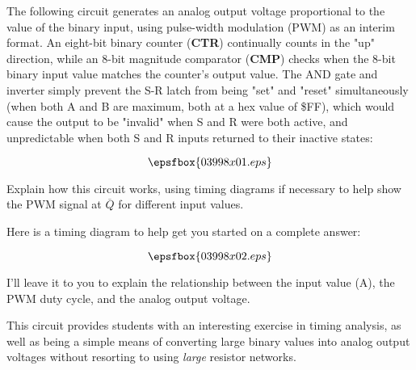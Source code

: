 

The following circuit generates an analog output voltage proportional to the value of the binary input, using pulse-width modulation (PWM) as an interim format.  An eight-bit binary counter ({\bf CTR}) continually counts in the "up" direction, while an 8-bit magnitude comparator ({\bf CMP}) checks when the 8-bit binary input value matches the counter's output value.  The AND gate and inverter simply prevent the S-R latch from being "set" and "reset" simultaneously (when both A and B are maximum, both at a hex value of \$FF), which would cause the output to be "invalid" when S and R were both active, and unpredictable when both S and R inputs returned to their inactive states:

$$\epsfbox{03998x01.eps}$$

Explain how this circuit works, using timing diagrams if necessary to help show the PWM signal at $\overline{Q}$ for different input values.

\vskip 150pt







Here is a timing diagram to help get you started on a complete answer:

$$\epsfbox{03998x02.eps}$$

I'll leave it to you to explain the relationship between the input value (A), the PWM duty cycle, and the analog output voltage.







This circuit provides students with an interesting exercise in timing analysis, as well as being a simple means of converting large binary values into analog output voltages without resorting to using {\it large} resistor networks.




